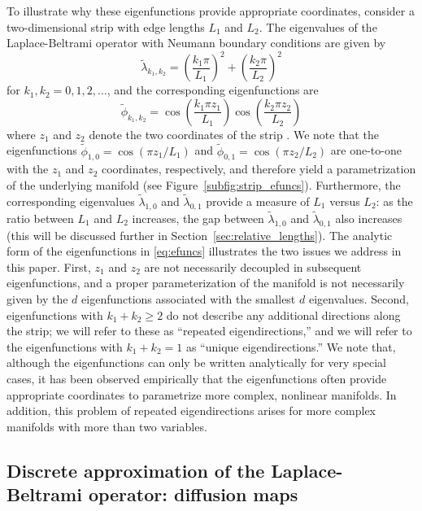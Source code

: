 To illustrate why these eigenfunctions provide appropriate coordinates, consider a two-dimensional strip with edge lengths $L_1$ and $L_2$.
%
The eigenvalues of the Laplace-Beltrami operator with Neumann boundary conditions are given by
\begin{equation} \label{eq:evals}
\tilde{\lambda}_{k_1, k_2} = \left( \frac{k_1 \pi}{L_1} \right)^2 + \left( \frac{k_2 \pi}{L_2} \right)^2
\end{equation}
for $k_1, k_2 = 0, 1, 2, \dots$,
and the corresponding eigenfunctions are
\begin{equation} \label{eq:efuncs}
\tilde{\phi}_{k_1, k_2} = \cos \left( \frac{k_1 \pi z_1}{L_1} \right) \cos \left( \frac{k_2 \pi z_2}{L_2} \right)
\end{equation}
where $z_1$ and $z_2$ denote the two coordinates of the strip \cite{singer2008non}.
%
We note that the eigenfunctions $\tilde{\phi}_{1, 0} = \cos \left( {\pi z_1}/{L_1} \right)$ and $\tilde{\phi}_{0, 1} = \cos \left( {\pi z_2}/{L_2} \right)$ are one-to-one with the $z_1$ and $z_2$ coordinates, respectively, and therefore yield a parametrization of the underlying manifold (see Figure~\ref{subfig:strip_efuncs}).
%
Furthermore, the corresponding eigenvalues $\tilde{\lambda}_{1,0}$ and $\tilde{\lambda}_{0,1}$ provide a measure of $L_1$ versus $L_2$: as the ratio between $L_1$ and $L_2$ increases, the gap between $\tilde{\lambda}_{1,0}$ and $\tilde{\lambda}_{0,1}$ also increases (this will be discussed further in Section~\ref{sec:relative_lengths}).
%
The analytic form of the eigenfunctions in \eqref{eq:efuncs} illustrates the two issues we address in this paper.
%
First, $z_1$ and $z_2$ are not necessarily decoupled in subsequent eigenfunctions, and a proper parameterization of the manifold is not necessarily given by the $d$ eigenfunctions associated with the smallest $d$ eigenvalues.
%
Second, eigenfunctions with $k_1+k_2 \ge 2$ do not describe any additional directions along the strip; we will refer to these as ``repeated eigendirections,'' and we will refer to the eigenfunctions with $k_1+k_2 =1$ as ``unique eigendirections.'' 
%
We note that, although the eigenfunctions can only be written analytically for very special cases, it has been observed empirically that the eigenfunctions often provide appropriate coordinates to parametrize more complex, nonlinear manifolds.
%
In addition, this problem of repeated eigendirections arises for more complex manifolds with more than two variables.


\subsection{Discrete approximation of the Laplace-Beltrami operator: diffusion maps}

